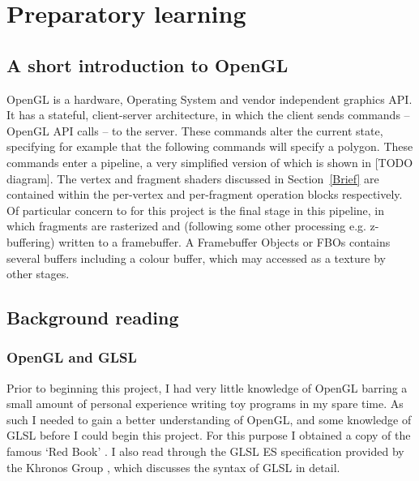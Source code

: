 \documentclass[12pt,twoside,notitlepage]{report}
\begin{document}
\begin{figure}
\label{depend}
\end{figure}

\section{Preparatory learning}
\subsection{A short introduction to OpenGL}
OpenGL is a hardware, Operating System and vendor independent graphics API. It has a stateful, client-server architecture, in which the client sends commands -- OpenGL API calls -- to the server. These commands alter the current state, specifying for example that the following commands will specify a polygon. These commands enter a pipeline, a very simplified version of which is shown in [TODO diagram]. The vertex and fragment shaders discussed in Section~\ref{Brief} are contained within the per-vertex and per-fragment operation blocks respectively. Of particular concern to for this project is the final stage in this pipeline, in which fragments are rasterized and (following some other processing e.g. z-buffering) written to a framebuffer. A Framebuffer Objects or FBOs contains several buffers including a colour buffer, which may accessed as a texture by other stages.

\subsection{Background reading}

\subsubsection{OpenGL and GLSL}
Prior to beginning this project, I had very little knowledge of OpenGL barring a small amount of personal experience writing toy programs in my spare time. As such I needed to gain a better understanding of OpenGL, and some knowledge of GLSL before I could begin this project. For this purpose I obtained a copy of the famous `Red Book' \cite{redbook}. I also read through the GLSL ES specification provided by the Khronos Group \cite{glsl-spec}, which discusses the syntax of GLSL in detail.
\end{document}
